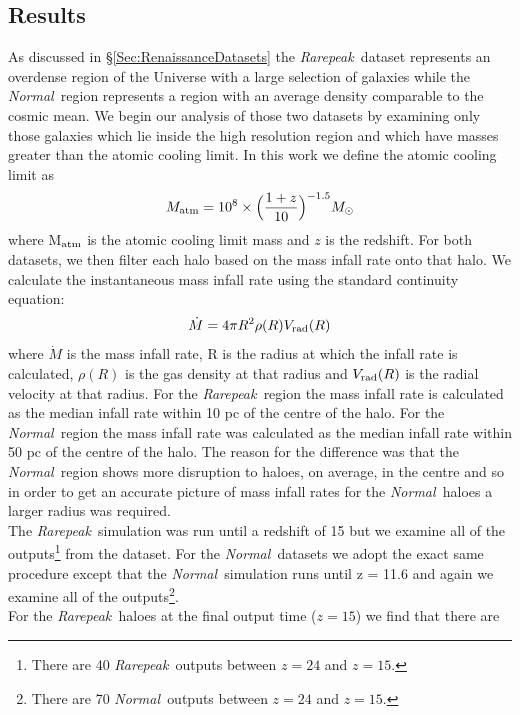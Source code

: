 \documentclass[graphics, twocolumn, usenatbib]{mn2e}
\newcommand{\rarepeak} {\textit{Rarepeak~}}
\newcommand{\normal} {\textit{Normal~}}
\begin{document}
\subsection{Results} \label{Sec:Results}

As discussed in \S \ref{Sec:RenaissanceDatasets} the \rarepeak dataset represents an overdense
region of the Universe with a large selection of galaxies while the \normal region represents a
region with an average density comparable to the cosmic mean. We begin our analysis of those two
datasets by examining only those galaxies which lie inside the high resolution region and which
have masses greater than the atomic cooling limit. In this work we define the atomic cooling
limit as
\begin{equation}
M_{\rm atm} = 10^8 \times \Big ({ {1 + z} \over {10}} \Big )^{-1.5} M_{\odot}
\end{equation}
where M$_{\rm atm}$ is the atomic cooling limit mass and $z$ is the redshift.
For both datasets, we then filter each halo based on the mass infall rate onto that halo.
We calculate the instantaneous mass infall rate using the standard continuity equation:
\begin{equation}  
  \dot{M} = 4 \pi R^2 \rho(R) V_{\rm rad}(R)
\end{equation}
where  $\dot{M}$ is the mass infall rate, R is the radius at which the infall rate is calculated,
$\rho(R)$ is the gas density at that radius and $V_{\rm rad}(R)$ is the radial velocity at that radius.
For the \rarepeak region the mass infall rate is calculated as the median infall rate within 10 pc
of the centre of the halo. For the \normal region  the mass infall rate was calculated as the median
infall rate within 50 pc of the centre of the halo. The reason for the difference was
that the \normal region shows more disruption to haloes, on average, in the centre and so in
order to get an accurate picture of mass infall rates for the \normal haloes a larger radius
was required. \\
\indent The \rarepeak simulation was run until a redshift of 15 but we
examine all of the outputs\footnote{There are 40 \rarepeak outputs between $z = 24$ and $z = 15$.}
from the dataset. For the \normal datasets we adopt the exact same procedure except that
the \normal simulation runs until z = 11.6 and again we examine all of the
outputs\footnote{There are 70 \normal outputs between $z = 24$ and $z = 15$.}.\\
\indent For the \rarepeak haloes at the final output time ($z = 15$) we find that there are
\end{document}
